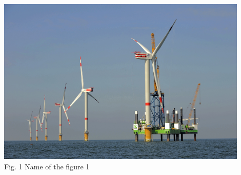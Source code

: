 \documentclass[12pt]{article}
\begin{document}
    \begin{minipage}[b]{1.0\linewidth}
      \begin{center}
        \includegraphics[width=0.9\textwidth]{1-WindF-1}
         \\ Fig. 1 Name of the figure 1
      \end{center}
    \end{minipage}

  
\end{document}
